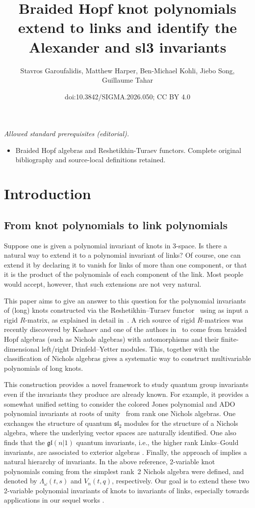 \documentclass[10pt,a4paper]{amsart}
\title{Braided Hopf knot polynomials extend to links and identify the Alexander and sl3 invariants}
\author{Stavros Garoufalidis, Matthew Harper, Ben-Michael Kohli, Jiebo Song, Guillaume Tahar}
\date{doi:10.3842/SIGMA.2026.050; CC BY 4.0}
\numberwithin{equation}{section}
\theoremstyle{definition}
\begin{document}
\maketitle
\noindent\textit{Allowed standard prerequisites (editorial).}\begin{itemize}
\item Braided Hopf algebras and Reshetikhin-Turaev functors. Complete original bibliography and source-local definitions retained.
\end{itemize}\medskip
\section{Introduction}
\label{sec:intro}

\subsection{From knot polynomials to link polynomials}
Suppose one is given a polynomial invariant of knots in 3-space. Is there a
natural way to extend it to a polynomial invariant of links? Of course, one
can extend it by declaring it to vanish for links of more than one component,
or that it is the product of the polynomials of each component of the link.
Most people would accept, however, that such extensions are not very natural.

This paper aims to give an answer to this question for the polynomial invariants
of (long) knots constructed via the Reshetikhin--Turaev functor~\cite{RT}
using as input a rigid $R$-matrix, as explained in detail in~\cite{Kas1}.
A rich source of rigid $R$-matrices was recently discovered by Kashaev and one
of the authors in~\cite{GK:multi} to come from braided Hopf algebras (such as Nichols
algebras) with automorphisms and their finite-dimensional left/right
Drinfeld--Yetter modules. This, together with the classification of Nichols algebras
gives a systematic way to construct multivariable polynomials of long knots.

This construction provides a novel framework to study quantum group invariants even if the invariants they produce are already known. For example, it provides a somewhat unified setting to consider the colored Jones polynomial and ADO polynomial invariants at roots of unity~\cite{ADO} from rank one Nichols algebras. One exchanges the structure of quantum $\mathfrak{sl}_2$ modules for the structure of a Nichols algebra, where the underlying vector spaces are naturally identified.
One also finds that the $\mathfrak{gl}(n|1)$ quantum invariants, i.e., the higher rank Links--Gould invariants, are associated to exterior algebras \cite{Kas3}.
Finally, the approach of \cite{GK:multi} implies a natural hierarchy of invariants. In the above reference,
2-variable knot polynomials coming from the simplest rank~2 Nichols algebra were
defined, and denoted by $\Lambda_\omega(t,s)$ and $V_n(t,q)$, respectively. Our goal is to extend these two 2-variable polynomial invariants of knots to invariants of links, especially towards applications in our sequel works \cite{GHKKST, GHKKW}.
\end{document}
